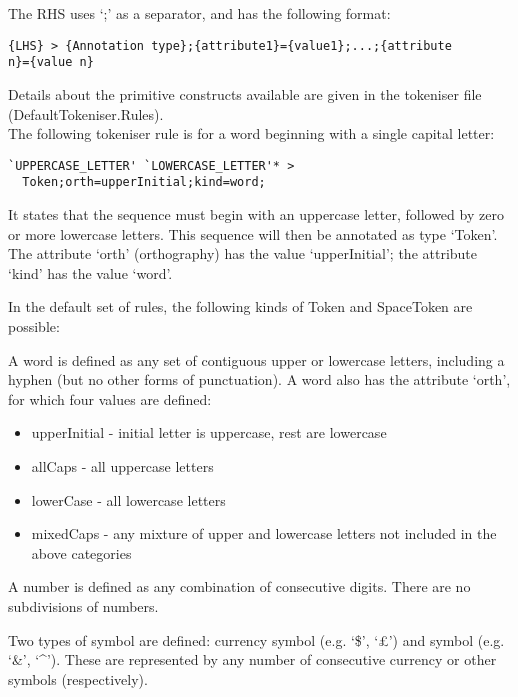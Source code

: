 \noindent
The RHS uses `;' as a separator, and has the following format:
\begin{small}
\begin{verbatim}
{LHS} > {Annotation type};{attribute1}={value1};...;{attribute
n}={value n}
\end{verbatim}
\end{small}

\noindent
Details about the primitive constructs available are given in the
tokeniser file (DefaultTokeniser.Rules).\\

\noindent
The following tokeniser rule is for a word
beginning with a single capital letter:
\begin{small}
\begin{verbatim}
`UPPERCASE_LETTER' `LOWERCASE_LETTER'* >
  Token;orth=upperInitial;kind=word;
\end{verbatim}
\end{small}
\noindent
It states that the sequence must begin with an uppercase letter,
followed by zero or more lowercase letters. This sequence will then be
annotated as type `Token'. The attribute `orth' (orthography) has
the value `upperInitial'; the attribute `kind' has the value
`word'.

In the default set of rules, the following kinds of Token and
SpaceToken are possible:

A word is defined as any set of
contiguous upper or lowercase letters, including a hyphen (but no other
forms of punctuation). A word also has the attribute `orth', for which
four values are defined:
\begin{itemize}
\item upperInitial - initial letter is uppercase, rest are lowercase
\item allCaps - all uppercase letters
\item lowerCase - all lowercase letters
\item mixedCaps - any mixture of upper and lowercase letters not
included in the above categories
\end{itemize}

A number is defined as any combination of consecutive digits. There
are no subdivisions of numbers.

Two types of symbol are defined: currency symbol (e.g. `\$', `\pounds') and
symbol (e.g. `\&', `\^{ }').
These are represented by any number of consecutive currency or other
symbols (respectively).


